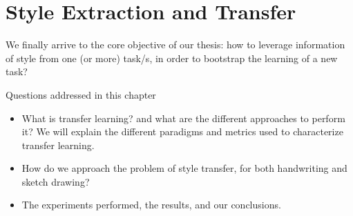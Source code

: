 \chapter{Style Extraction and Transfer} \label{ch:seat}
\minitoc%


\par We finally arrive to the core objective of our thesis: how to leverage information of style from one (or more) task/s, in order to bootstrap the learning of a new task?

\begin{mdframed}[backgroundcolor=blue!20]
  \begin{center}
    Questions addressed in this chapter
  \end{center}

  \begin{itemize}
    \item What is transfer learning? and what are the different approaches to perform it? We will explain the different paradigms and metrics used to characterize transfer learning.
    \item How do we approach the problem of style transfer, for both handwriting and sketch drawing?
    \item The experiments performed, the results, and our conclusions.
  \end{itemize}
\end{mdframed}

\clearpage


